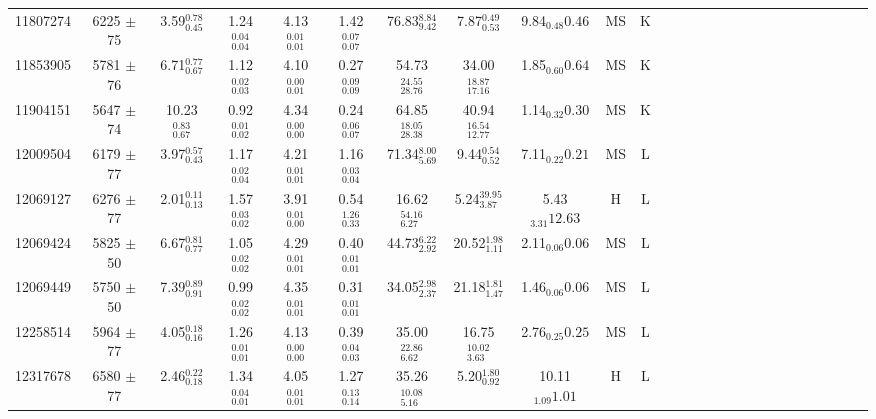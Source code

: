 \begin{table}
\begin{tabular}{cccccccccccccccccccccccccc}
11807274 & 6225 $\pm$ 75 & 3.59$_{0.45}^{0.78}$ & 1.24$_{0.04}^{0.04}$ & 4.13$_{0.01}^{0.01}$ & 1.42$_{0.07}^{0.07}$ & 76.83$_{9.42}^{8.84}$ & 7.87$_{0.53}^{0.49}$ & 9.84$_{0.48}{0.46}$ & MS & K \\
11853905 & 5781 $\pm$ 76 & 6.71$_{0.67}^{0.77}$ & 1.12$_{0.03}^{0.02}$ & 4.10$_{0.01}^{0.00}$ & 0.27$_{0.09}^{0.09}$ & 54.73$_{28.76}^{24.55}$ & 34.00$_{17.16}^{18.87}$ & 1.85$_{0.60}{0.64}$ & MS & K \\
11904151 & 5647 $\pm$ 74 & 10.23$_{0.67}^{0.83}$ & 0.92$_{0.02}^{0.01}$ & 4.34$_{0.00}^{0.00}$ & 0.24$_{0.07}^{0.06}$ & 64.85$_{28.38}^{18.05}$ & 40.94$_{12.77}^{16.54}$ & 1.14$_{0.32}{0.30}$ & MS & K \\
12009504 & 6179 $\pm$ 77 & 3.97$_{0.43}^{0.57}$ & 1.17$_{0.04}^{0.02}$ & 4.21$_{0.01}^{0.01}$ & 1.16$_{0.04}^{0.03}$ & 71.34$_{5.69}^{8.00}$ & 9.44$_{0.52}^{0.54}$ & 7.11$_{0.22}{0.21}$ & MS & L \\
12069127 & 6276 $\pm$ 77 & 2.01$_{0.13}^{0.11}$ & 1.57$_{0.02}^{0.03}$ & 3.91$_{0.00}^{0.01}$ & 0.54$_{0.33}^{1.26}$ & 16.62$_{6.27}^{54.16}$ & 5.24$_{3.87}^{39.95}$ & 5.43$_{3.31}{12.63}$ & H & L \\
12069424 & 5825 $\pm$ 50 & 6.67$_{0.77}^{0.81}$ & 1.05$_{0.02}^{0.02}$ & 4.29$_{0.01}^{0.01}$ & 0.40$_{0.01}^{0.01}$ & 44.73$_{2.92}^{6.22}$ & 20.52$_{1.11}^{1.98}$ & 2.11$_{0.06}{0.06}$ & MS & L \\
12069449 & 5750 $\pm$ 50 & 7.39$_{0.91}^{0.89}$ & 0.99$_{0.02}^{0.02}$ & 4.35$_{0.01}^{0.01}$ & 0.31$_{0.01}^{0.01}$ & 34.05$_{2.37}^{2.98}$ & 21.18$_{1.47}^{1.81}$ & 1.46$_{0.06}{0.06}$ & MS & L \\
12258514 & 5964 $\pm$ 77 & 4.05$_{0.16}^{0.18}$ & 1.26$_{0.01}^{0.01}$ & 4.13$_{0.00}^{0.00}$ & 0.39$_{0.03}^{0.04}$ & 35.00$_{6.62}^{22.86}$ & 16.75$_{3.63}^{10.02}$ & 2.76$_{0.25}{0.25}$ & MS & L \\
12317678 & 6580 $\pm$ 77 & 2.46$_{0.18}^{0.22}$ & 1.34$_{0.01}^{0.04}$ & 4.05$_{0.01}^{0.01}$ & 1.27$_{0.14}^{0.13}$ & 35.26$_{5.16}^{10.08}$ & 5.20$_{0.92}^{1.80}$ & 10.11$_{1.09}{1.01}$ & H & L \\
\end{tabular}
\end{table}